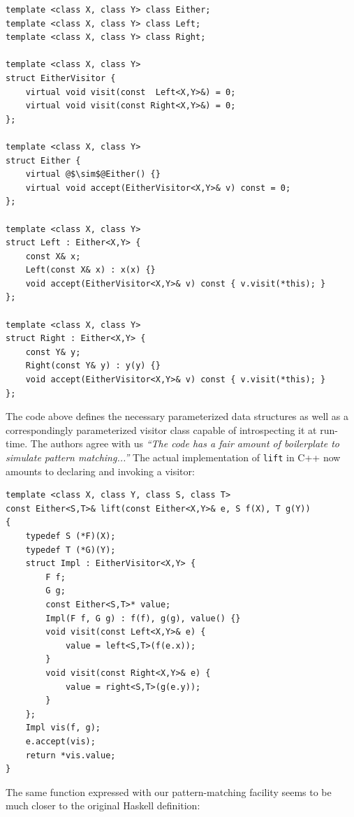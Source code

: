 \documentclass[preprint]{sigplanconf}
\DeclareRobustCommand{\codehaskell}[1]{{\lstinline[breaklines=false,language=Haskell]{#1}}}
\begin{document}
\begin{lstlisting}
template <class X, class Y> class Either;
template <class X, class Y> class Left;
template <class X, class Y> class Right;

template <class X, class Y>
struct EitherVisitor {
    virtual void visit(const  Left<X,Y>&) = 0;
    virtual void visit(const Right<X,Y>&) = 0;
};

template <class X, class Y>
struct Either {
    virtual @$\sim$@Either() {}
    virtual void accept(EitherVisitor<X,Y>& v) const = 0;
};

template <class X, class Y>
struct Left : Either<X,Y> {
    const X& x;
    Left(const X& x) : x(x) {}
    void accept(EitherVisitor<X,Y>& v) const { v.visit(*this); }
};

template <class X, class Y>
struct Right : Either<X,Y> {
    const Y& y;
    Right(const Y& y) : y(y) {}
    void accept(EitherVisitor<X,Y>& v) const { v.visit(*this); }
};
\end{lstlisting}

The code above defines the necessary parameterized data structures as well as a 
correspondingly parameterized visitor class capable of introspecting it at 
run-time. The authors agree with us \emph{``The code has a fair amount of 
boilerplate to simulate pattern matching...''}\cite{DRJ05} The actual 
implementation of \codehaskell{lift} in C++ now amounts to declaring and 
invoking a visitor:

\begin{lstlisting}
template <class X, class Y, class S, class T>
const Either<S,T>& lift(const Either<X,Y>& e, S f(X), T g(Y))
{
    typedef S (*F)(X);
    typedef T (*G)(Y);
    struct Impl : EitherVisitor<X,Y> {
        F f;
        G g;
        const Either<S,T>* value;
        Impl(F f, G g) : f(f), g(g), value() {}
        void visit(const Left<X,Y>& e) {
            value = left<S,T>(f(e.x));
        }
        void visit(const Right<X,Y>& e) {
            value = right<S,T>(g(e.y));
        }
    };
    Impl vis(f, g);
    e.accept(vis);
    return *vis.value;
}
\end{lstlisting}

The same function expressed with our pattern-matching facility seems to be much 
closer to the original Haskell definition:

\end{document}
